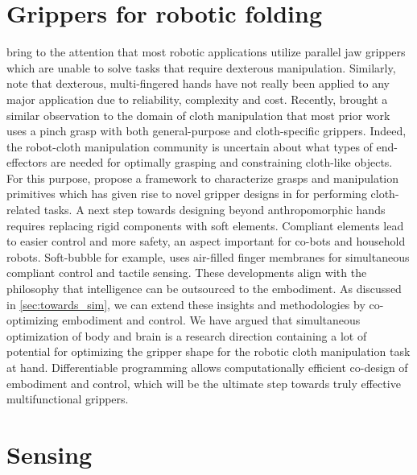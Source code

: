\documentclass[\home/main.tex]{subfiles}
\begin{document}
\section{Grippers for robotic folding}
\Textcite{Billard2019} bring to the attention that most robotic applications utilize parallel jaw grippers which are unable to solve tasks that require dexterous manipulation.
Similarly, \textcite{Siciliano2008} note that dexterous, multi-fingered hands have not really been applied to any major application due to reliability, complexity and cost. Recently, \textcite{Borras2020} brought a similar observation to the domain of cloth manipulation that most prior work uses a pinch grasp with both general-purpose and cloth-specific grippers. Indeed, the robot-cloth manipulation community is uncertain about what types of end-effectors are needed for optimally grasping and constraining cloth-like objects. For this purpose, \citeauthor{Borras2020} propose a framework to characterize grasps and manipulation primitives which has given rise to novel gripper designs in \autocite{Donaire2020} for performing cloth-related tasks. 
A next step towards designing beyond anthropomorphic hands requires replacing rigid components with soft elements. Compliant elements lead to easier control and more safety, an aspect important for co-bots and household robots. Soft-bubble \autocite{Naveen2020soft} for example, uses air-filled finger membranes for simultaneous compliant control and tactile sensing.
These developments align with the philosophy that intelligence can be outsourced to the embodiment.
As discussed in \cref{sec:towards_sim}, we can extend these insights and methodologies by co-optimizing embodiment and control. We have argued that simultaneous optimization of body and brain is a research direction containing a lot of potential for optimizing the gripper shape for the robotic cloth manipulation task at hand. Differentiable programming allows computationally efficient co-design of embodiment and control, which will be the ultimate step towards truly effective multifunctional grippers.



\section{Sensing}
\end{document}

